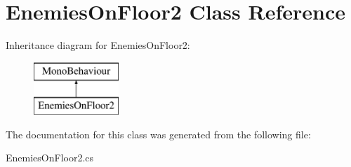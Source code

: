 \hypertarget{class_enemies_on_floor2}{}\section{Enemies\+On\+Floor2 Class Reference}
\label{class_enemies_on_floor2}
Inheritance diagram for Enemies\+On\+Floor2\+:\begin{figure}[H]
\begin{center}
\leavevmode
\includegraphics[height=2.000000cm]{class_enemies_on_floor2}
\end{center}
\end{figure}


The documentation for this class was generated from the following file\+:\begin{DoxyCompactItemize}
\item 
Enemies\+On\+Floor2.\+cs\end{DoxyCompactItemize}
